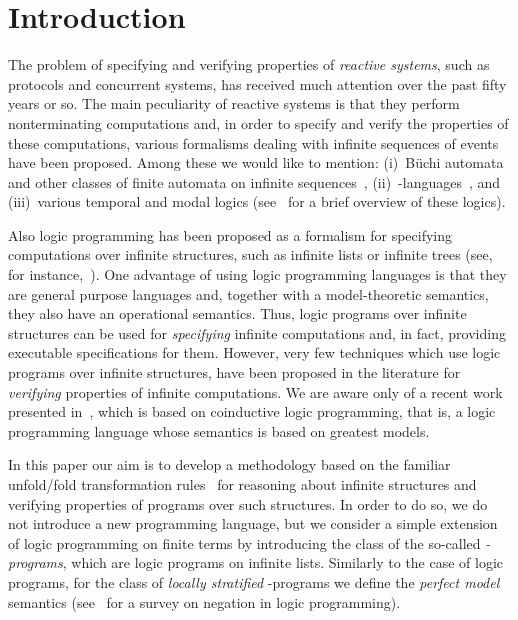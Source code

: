 \documentclass[english]{tlp}
\begin{document}
\section{Introduction
\label{sec:introduction}}The problem of specifying and verifying
properties of {\em reactive systems}, such as protocols and
concurrent systems, has received much attention over the past fifty
years or so. The main peculiarity of reactive systems is that they
perform nonterminating computations and, in order to specify and
verify the properties of these computations, various formalisms
dealing with infinite sequences of events have been proposed. Among
these we would like to mention: (i)~B\"uchi automata and other
classes of finite automata on infinite sequences~\cite{Tho90},
(ii)~-languages~\cite{Sta97}, and (iii)~various temporal and
modal logics (see~\cite{Cl&99} for a brief overview of these
logics).

Also logic programming has been proposed as a formalism for
specifying computations over infinite structures, such as infinite
lists or infinite trees (see, for
instance,~\cite{Col82,Llo87,Si&06,MiG09}). One advantage of using
logic programming languages is that they are general purpose
languages and, together with a model-theoretic semantics, they also have
an operational semantics. Thus, logic programs over infinite
structures can be used for {\em specifying\/} infinite computations
and, in fact, providing executable specifications for them. However,
very few techniques which use logic programs over infinite
structures, have been proposed in the literature for {\em verifying\/}
properties of infinite computations. We are aware only of a recent
work presented in~\cite{Gu&07}, which is based on {\rm coinductive}
logic programming, that is, a logic programming language whose
semantics is based on greatest models.

In this paper our aim is to develop a 
methodology based on the familiar unfold/fold transformation rules~\cite{BuD77,TaS84} 
for reasoning about infinite structures and verifying properties
of programs over such structures. In order to do so,
we do not introduce a new 
programming language, but we consider a simple 
extension of logic programming on finite terms by introducing
the class of the so-called {\em -programs}, which are 
logic programs on infinite lists. 
Similarly to the case of logic programs,
for the class of {\em locally stratified}  -programs
we define the {\em perfect model}
semantics (see~\cite{ApB94} for a survey on negation in 
logic programming). 
\end{document}
